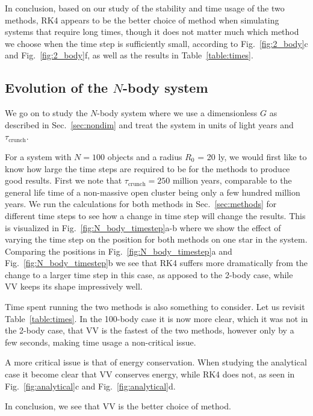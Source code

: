 \documentclass{article}
\begin{document}
\begin{multicols}{2}
In conclusion, based on our study of the stability and time usage of the two methods, RK4 appears to be the better choice of method when simulating systems that require long times, though it does not matter much which method we choose when the time step is sufficiently small, according to Fig.~\ref{fig:2_body}c and Fig.~\ref{fig:2_body}f, as well as the results in Table~\ref{table:times}.



\subsection{Evolution of the $N$-body system}
We go on to study the $N$-body system where we use a dimensionless $G$ as described in Sec.~\ref{sec:nondim} and treat the system in units of light years and $\tau_{\mathrm{crunch}}$. 

For a system with $N = 100$ objects and a radius $R_0$ = 20 ly, we would first like to know how large the time steps are required to be for the methods to produce good results. First we note that $\tau_{\mathrm{crunch}} = 250$ million years, comparable to the general life time of a non-massive open cluster being only a few hundred million years. We run the calculations for both methods in Sec.~\ref{sec:methods} for different time steps to see how a change in time step will change the results. This is visualized in Fig.~\ref{fig:N_body_timestep}a-b where we show the effect of varying the time step on the position for both methods on one star in the system. Comparing the positions in Fig.~\ref{fig:N_body_timestep}a and Fig.~\ref{fig:N_body_timestep}b we see that RK4 suffers more dramatically from the change to a larger time step in this case, as apposed to the 2-body case, while VV keeps its shape impressively well.

Time spent running the two methods is also something to consider. Let us revisit Table~\ref{table:times}. In the 100-body case it is now more clear, which it was not in the 2-body case, that VV is the fastest of the two methods, however only by a few seconds, making time usage a non-critical issue.

A more critical issue is that of energy conservation. When studying the analytical case it become clear that VV conserves energy, while RK4 does not, as seen in Fig.~\ref{fig:analytical}c and Fig.~\ref{fig:analytical}d.

In conclusion, we see that VV is the better choice of method.  \\



\end{multicols}
\end{document}
